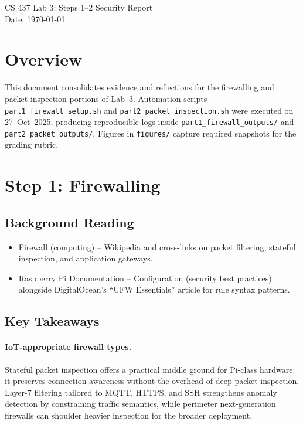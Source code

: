 \documentclass[11pt]{article}
\begin{document}
\begin{center}
    {\LARGE CS 437 Lab 3: Steps 1--2 Security Report}\\[0.5em]
    {\large Date: \today}
\end{center}

\section{Overview}
This document consolidates evidence and reflections for the firewalling and packet-inspection portions of Lab~3. Automation scripts \texttt{part1\_firewall\_setup.sh} and \texttt{part2\_packet\_inspection.sh} were executed on 27~Oct~2025, producing reproducible logs inside \texttt{part1\_firewall\_outputs/} and \texttt{part2\_packet\_outputs/}. Figures in \texttt{figures/} capture required snapshots for the grading rubric.

\section{Step 1: Firewalling}
\subsection{Background Reading}
\begin{itemize}[leftmargin=*]
    \item \href{https://en.wikipedia.org/wiki/Firewall_(computing)}{Firewall (computing) -- Wikipedia} and cross-links on packet filtering, stateful inspection, and application gateways.
    \item Raspberry Pi Documentation -- Configuration (security best practices) alongside DigitalOcean's ``UFW Essentials'' article for rule syntax patterns.
\end{itemize}

\subsection{Key Takeaways}
\paragraph{IoT-appropriate firewall types.} Stateful packet inspection offers a practical middle ground for Pi-class hardware: it preserves connection awareness without the overhead of deep packet inspection. Layer-7 filtering tailored to MQTT, HTTPS, and SSH strengthens anomaly detection by constraining traffic semantics, while perimeter next-generation firewalls can shoulder heavier inspection for the broader deployment.
\end{document}
